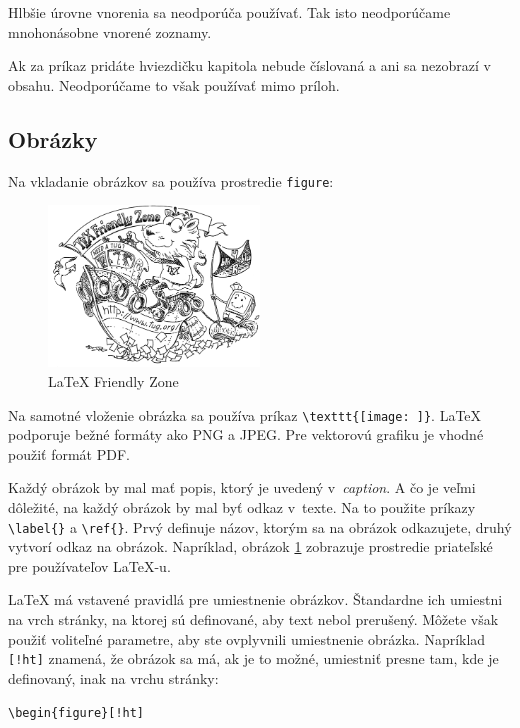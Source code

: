 Hlbšie úrovne vnorenia sa neodporúča používať. Tak isto neodporúčame mnohonásobne vnorené zoznamy.

Ak za príkaz pridáte hviezdičku kapitola nebude číslovaná a ani sa nezobrazí v obsahu. Neodporúčame to však používať mimo príloh.

\subsection*{Obrázky}

Na vkladanie obrázkov sa používa prostredie \texttt{figure}:

\begin{figure}
  \centering
  \includegraphics[width=0.5\textwidth]{figures/tugboat}
  \caption{\LaTeX{} Friendly Zone \label{o:latex_friendly_zone}}
\end{figure}

Na samotné vloženie obrázka sa používa príkaz \verb|\texttt{[image: ]}|. \LaTeX{} podporuje bežné formáty ako PNG a JPEG. Pre vektorovú grafiku je vhodné použiť formát PDF.

Každý obrázok by mal mať popis, ktorý je uvedený v~\emph{caption}. A čo je veľmi dôležité, na každý obrázok by mal byť odkaz v~texte. Na to použite príkazy \verb|\label{}| a \verb|\ref{}|. Prvý definuje názov, ktorým sa na obrázok odkazujete, druhý vytvorí odkaz na obrázok. Napríklad, obrázok \ref{o:latex_friendly_zone} zobrazuje prostredie priateľské pre používateľov \LaTeX-u.

\LaTeX{} má vstavené pravidlá pre umiestnenie obrázkov. Štandardne ich umiestni na vrch stránky, na ktorej sú definované, aby text nebol prerušený. Môžete však použiť voliteľné parametre, aby ste ovplyvnili umiestnenie obrázka. Napríklad \texttt{[!ht]} znamená, že obrázok sa má, ak je to možné, umiestniť presne tam, kde je definovaný, inak na vrchu stránky:

\begin{lstlisting}
\begin{figure}[!ht]
\end{lstlisting}

